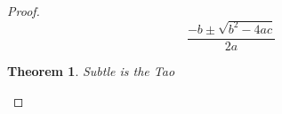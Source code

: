 \documentclass{amsart}
\newtheorem{thm}{Theorem}
\begin{document}
\begin{proof}
\[
    \frac{-b \pm \sqrt{b^2-4ac}}{2a}
\]
\renewcommand\qedsymbol{}
\begin{thm}Subtle is the Tao\end{thm}
\end{proof}
\end{document}
